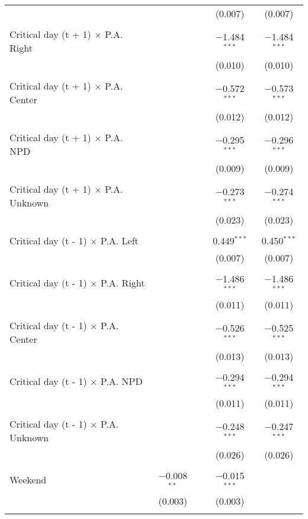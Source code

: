 \documentclass[
]{article}
\begin{document}
\begin{table}[!htbp]
{\begin{tabular}{@{\extracolsep{5pt}}lcccc}
  &  &  & (0.007) & (0.007) \\ 
  & & & & \\ 
 Critical day (t + 1) $\times$ P.A. Right &  &  & $-$1.484$^{***}$ & $-$1.484$^{***}$ \\ 
  &  &  & (0.010) & (0.010) \\ 
  & & & & \\ 
 Critical day (t + 1) $\times$ P.A. Center &  &  & $-$0.572$^{***}$ & $-$0.573$^{***}$ \\ 
  &  &  & (0.012) & (0.012) \\ 
  & & & & \\ 
 Critical day (t + 1) $\times$ P.A. NPD &  &  & $-$0.295$^{***}$ & $-$0.296$^{***}$ \\ 
  &  &  & (0.009) & (0.009) \\ 
  & & & & \\ 
 Critical day (t + 1) $\times$ P.A. Unknown &  &  & $-$0.273$^{***}$ & $-$0.274$^{***}$ \\ 
  &  &  & (0.023) & (0.023) \\ 
  & & & & \\ 
 Critical day (t - 1) $\times$ P.A. Left &  &  & 0.449$^{***}$ & 0.450$^{***}$ \\ 
  &  &  & (0.007) & (0.007) \\ 
  & & & & \\ 
 Critical day (t - 1) $\times$ P.A. Right &  &  & $-$1.486$^{***}$ & $-$1.486$^{***}$ \\ 
  &  &  & (0.011) & (0.011) \\ 
  & & & & \\ 
 Critical day (t - 1) $\times$ P.A. Center &  &  & $-$0.526$^{***}$ & $-$0.525$^{***}$ \\ 
  &  &  & (0.013) & (0.013) \\ 
  & & & & \\ 
 Critical day (t - 1) $\times$ P.A. NPD &  &  & $-$0.294$^{***}$ & $-$0.294$^{***}$ \\ 
  &  &  & (0.011) & (0.011) \\ 
  & & & & \\ 
 Critical day (t - 1) $\times$ P.A. Unknown &  &  & $-$0.248$^{***}$ & $-$0.247$^{***}$ \\ 
  &  &  & (0.026) & (0.026) \\ 
  & & & & \\ 
 Weekend & $-$0.008$^{**}$ &  & $-$0.015$^{***}$ &  \\ 
  & (0.003) &  & (0.003) &  \\ 
  & & & & \\ 

\end{tabular}}
\end{table}
\end{document}
